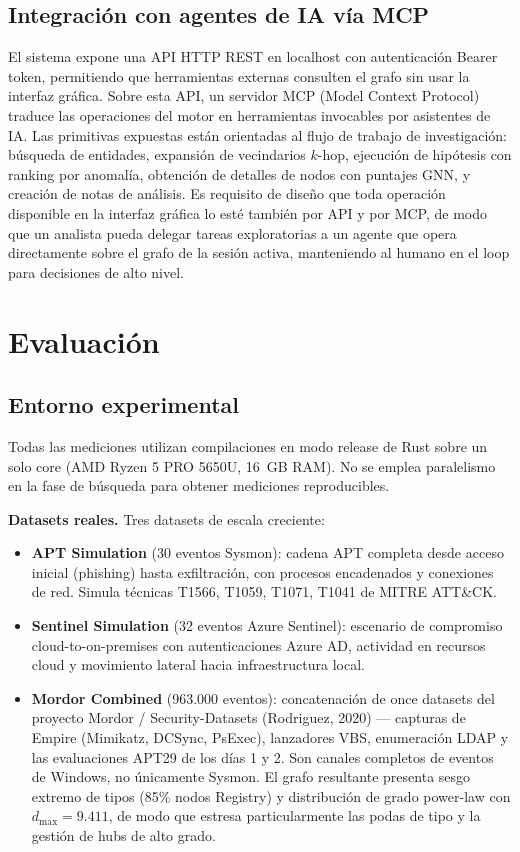 \documentclass[11pt,a4paper]{article}
\begin{document}
\subsection{Integración con agentes de IA vía MCP}
El sistema expone una API HTTP REST en localhost con autenticación Bearer
token, permitiendo que herramientas externas consulten el grafo sin usar la
interfaz gráfica. Sobre esta API, un servidor MCP (Model Context Protocol)
traduce las operaciones del motor en herramientas invocables por asistentes de
IA. Las primitivas expuestas están orientadas al flujo de trabajo de
investigación: búsqueda de entidades, expansión de vecindarios $k$-hop,
ejecución de hipótesis con ranking por anomalía, obtención de detalles de nodos
con puntajes GNN, y creación de notas de análisis. Es requisito de diseño que
toda operación disponible en la interfaz gráfica lo esté también por API y por
MCP, de modo que un analista pueda delegar tareas exploratorias a un agente que
opera directamente sobre el grafo de la sesión activa, manteniendo al humano en
el loop para decisiones de alto nivel.

\section{Evaluación}

\subsection{Entorno experimental}
Todas las mediciones utilizan compilaciones en modo release de Rust sobre un
solo core (AMD Ryzen 5 PRO 5650U, 16~GB RAM). No se emplea paralelismo en la
fase de búsqueda para obtener mediciones reproducibles.

\textbf{Datasets reales.} Tres datasets de escala creciente:
\begin{itemize}[leftmargin=*]
  \item \textbf{APT Simulation} (30 eventos Sysmon): cadena APT completa desde
  acceso inicial (phishing) hasta exfiltración, con procesos encadenados y
  conexiones de red. Simula técnicas T1566, T1059, T1071, T1041 de MITRE
  ATT\&CK.
  \item \textbf{Sentinel Simulation} (32 eventos Azure Sentinel): escenario de
  compromiso cloud-to-on-premises con autenticaciones Azure AD, actividad en
  recursos cloud y movimiento lateral hacia infraestructura local.
  \item \textbf{Mordor Combined} (963.000 eventos): concatenación de once
  datasets del proyecto Mordor / Security-Datasets (Rodriguez, 2020) ---
  capturas de Empire (Mimikatz, DCSync, PsExec), lanzadores VBS, enumeración
  LDAP y las evaluaciones APT29 de los días 1 y 2. Son canales completos de
  eventos de Windows, no únicamente Sysmon. El grafo resultante presenta sesgo
  extremo de tipos (85\% nodos Registry) y distribución de grado power-law con
  $d_{\max} = 9.411$, de modo que estresa particularmente las podas de tipo y
  la gestión de hubs de alto grado.
\end{itemize}
\end{document}
